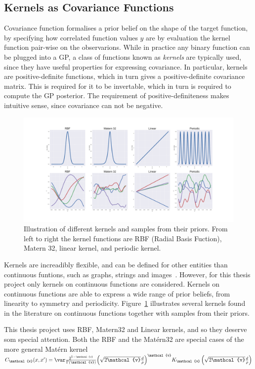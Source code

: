 \subsection{Kernels as Covariance Functions}\label{sec:kernels-as-priors}
Covariance function formalises a prior belief on the shape of the target
function, by specifying how correlated function values $y$ are by
evaluation the kernel function pair-wise on the observarions. 
While in practice any binary function can be plugged into
a GP, a class of functions known as \textit{kernels} are typically
used, since they have useful properties for expressing covariance. In
particular, kernels are positive-definite functions, which in turn
gives a positive-definite covariance matrix. This is required for it
to be invertable, which in turn is required to compute the GP posterior. 
The requirement of positive-definiteness makes intuitive sense, since covariance can not
be negative. 
\begin{figure}
  \centering
  \includegraphics[width=\textwidth]{figures/kernel-priors-vert}
  \caption{Illustration of different kernels and samples from their
    priors. From left to right the kernel functions are RBF (Radial
    Basis Fuction), Matern 32, linear kernel, and periodic kernel.}\label{fig:kernel-priors}
\end{figure}
Kernels are increadibly flexible, and can be defined for other entities than continuous
funtions, such as graphs, strings and
images~\cite{duvenaud2013structure}. However, for this thesis project
only kernels on continuous functions are considered. Kernels on
continuous functions are able to express a wide range of prior beliefs, from linearity to symmetry and
periodicity. Figure~\ref{fig:kernel-priors} illustrates several kernels
found in the literature on continuous functions together with samples from their priors.

This thesis project uses RBF, Matern32 and Linear kernels,
and so they deserve som special attention. Both the RBF and the Matérn32
are special cases of the more general Matérn kernel
$C_\mathcal{v}(x, x') = \var
\frac{2^{1-\mathcal{v}}}{\Gamma(\mathcal{v})} {\left(
\sqrt{2\mathcal{v}}\frac{d}{\rho}\right)}^\mathcal{v} K_\mathcal{v}
\left(\sqrt{2\mathcal{v}}\frac{d}{\rho}\right)$

